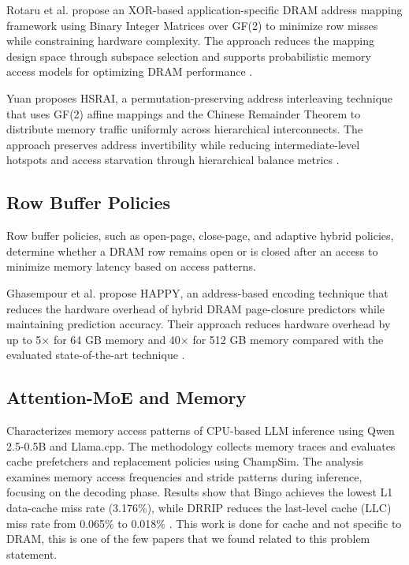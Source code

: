 \documentclass{article}
\begin{document}
Rotaru et al. propose an XOR-based application-specific DRAM address mapping framework using Binary Integer Matrices over GF(2) to minimize row misses while constraining hardware complexity. The approach reduces the mapping design space through subspace selection and supports probabilistic memory access models for optimizing DRAM performance \cite{rotaru2026mathematical}.

Yuan proposes HSRAI, a permutation-preserving address interleaving technique that uses GF(2) affine mappings and the Chinese Remainder Theorem to distribute memory traffic uniformly across hierarchical interconnects. The approach preserves address invertibility while reducing intermediate-level hotspots and access starvation through hierarchical balance metrics \cite{yuan2026hsraipermutationpreservingaddressinterleaving}.


\subsection{Row Buffer Policies}
Row buffer policies, such as open-page, close-page, and adaptive hybrid policies, determine whether a DRAM row remains open or is closed after an access to minimize memory latency based on access patterns.

Ghasempour et al. propose HAPPY, an address-based encoding technique that reduces the hardware overhead of hybrid DRAM page-closure predictors while maintaining prediction accuracy. Their approach reduces hardware overhead by up to 5× for 64 GB memory and 40× for 512 GB memory compared with the evaluated state-of-the-art technique \cite{ghasempour2016happy}.



\subsection{Attention-MoE and Memory}
Characterizes memory access patterns of CPU-based LLM inference using Qwen 2.5-0.5B and Llama.cpp. The methodology collects memory traces and evaluates cache prefetchers and replacement policies using ChampSim. The analysis examines memory access frequencies and stride patterns during inference, focusing on the decoding phase. Results show that Bingo achieves the lowest L1 data-cache miss rate (3.176\%), while DRRIP reduces the last-level cache (LLC) miss rate from 0.065\% to 0.018\% \cite{banasik2025memoryaccesscharacterizationlarge}. This work is done for cache and not specific to DRAM, this is one of the few papers that we found related to this problem statement.
\end{document}
